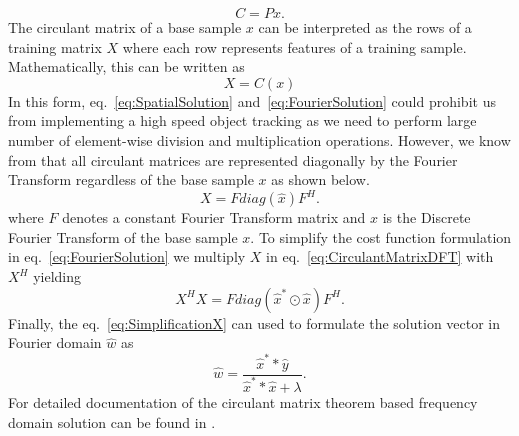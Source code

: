 \documentclass[10pt,twocolumn,letterpaper]{article}
\begin{document}
\begin{equation}
C = Px.
\label{eq:CirculantMatrixGeneration}
\end{equation}
The circulant matrix of a base sample $x$ can be interpreted as the rows of a training matrix $X$ where each row represents features of a training sample. Mathematically, this can be written as
\begin{equation}
X = C(x)
\label{eq:CIrculantMatrixTrainingData}
\end{equation}
In this form, eq.~\ref{eq:SpatialSolution} and~\ref{eq:FourierSolution} could prohibit us from implementing a high speed object tracking as we need to perform large number of element-wise division and multiplication operations. However, we know from \cite{gray2006toeplitz} that all circulant matrices are represented diagonally by the Fourier Transform regardless of the base sample $x$ as shown below.
\begin{equation}
X = Fdiag(\hat{x})F^{H}.
\label{eq:CirculantMatrixDFT}
\end{equation}
where $F$ denotes a constant Fourier Transform matrix and $x$ is the Discrete Fourier Transform of the base sample $x$. To simplify the cost function formulation in eq.~\ref{eq:FourierSolution} we multiply $X$ in eq.~\ref{eq:CirculantMatrixDFT} with $X^{H}$ yielding 
\begin{equation}
X^{H}X = Fdiag(\hat{x}^{*}\odot \hat{x})F^{H}.
\label{eq:SimplificationX} 
\end{equation}
Finally, the eq.~\ref{eq:SimplificationX} can used to formulate the solution vector in Fourier domain $\hat{w}$ as
\begin{equation}
\hat{w} = \dfrac{\hat{x}^{*}*\hat{y}}{\hat{x}^{*}*\hat{x}+\lambda}.
\label{eq:DiagonalizedPrimalSolution}
\end{equation}
For detailed documentation of the circulant matrix theorem based frequency domain solution can be found in \cite{henriques2012exploiting,henriques2015high}.
\end{document}
